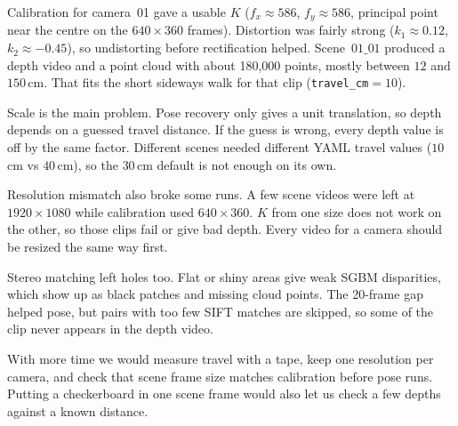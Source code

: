 \documentclass[conference]{assets/latex/IEEEtran}
\begin{document}
Calibration for camera~01 gave a usable $K$
($f_x{\approx}586$, $f_y{\approx}586$, principal
point near the centre on the $640{\times}360$ frames).
Distortion was fairly strong
($k_1{\approx}0.12$, $k_2{\approx}{-}0.45$), so
undistorting before rectification helped.
Scene~$01\_01$ produced a depth video and a point
cloud with about 180{,}000 points, mostly between
$12$ and $150$\,cm. That fits the short sideways walk
for that clip (\texttt{travel\_cm}${}={}10$).

Scale is the main problem. Pose recovery only gives
a unit translation, so depth depends on a guessed
travel distance. If the guess is wrong, every depth
value is off by the same factor. Different scenes
needed different YAML travel values ($10$\,cm vs
$40$\,cm), so the $30$\,cm default is not enough on
its own.

Resolution mismatch also broke some runs. A few
scene videos were left at $1920{\times}1080$ while
calibration used $640{\times}360$. $K$ from one
size does not work on the other, so those clips fail
or give bad depth. Every video for a camera should
be resized the same way first.

Stereo matching left holes too. Flat or shiny areas
give weak SGBM disparities, which show up as black
patches and missing cloud points. The 20-frame gap
helped pose, but pairs with too few SIFT matches are
skipped, so some of the clip never appears in the
depth video.

With more time we would measure travel with a tape,
keep one resolution per camera, and check that scene
frame size matches calibration before pose runs.
Putting a checkerboard in one scene frame would also
let us check a few depths against a known distance.
\end{document}
